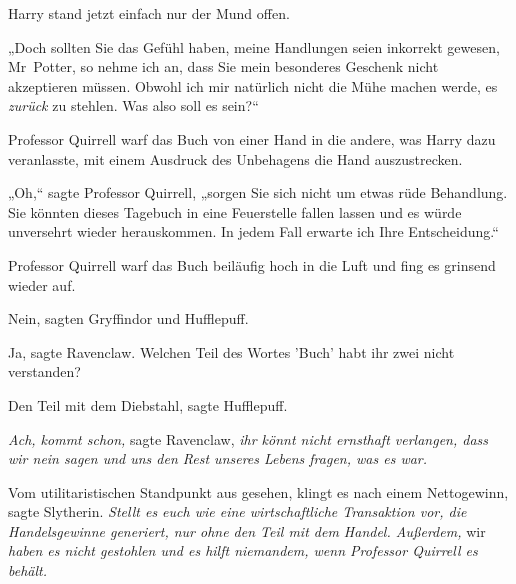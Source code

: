 {%
Harry stand jetzt einfach nur der Mund offen.

„Doch sollten Sie das Gefühl haben, meine Handlungen seien inkorrekt gewesen, Mr~Potter, so nehme ich an, dass Sie mein besonderes Geschenk nicht akzeptieren müssen. Obwohl ich mir natürlich nicht die Mühe machen werde, es \emph{zurück} zu stehlen. Was also soll es sein?“

Professor Quirrell warf das Buch von einer Hand in die andere, was Harry dazu veranlasste, mit einem Ausdruck des Unbehagens die Hand auszustrecken.

„Oh,“ sagte Professor Quirrell, „sorgen Sie sich nicht um etwas rüde Behandlung. Sie könnten dieses Tagebuch in eine Feuerstelle fallen lassen und es würde unversehrt wieder herauskommen. In jedem Fall erwarte ich Ihre Entscheidung.“

Professor Quirrell warf das Buch beiläufig hoch in die Luft und fing es grinsend wieder auf.

Nein, sagten Gryffindor und Hufflepuff.

Ja, sagte Ravenclaw. Welchen Teil des Wortes 'Buch' habt ihr zwei nicht verstanden?

Den Teil mit dem Diebstahl, sagte Hufflepuff.

\emph{Ach, kommt schon,} sagte Ravenclaw, \emph{ihr könnt nicht ernsthaft verlangen, dass wir nein sagen und uns den Rest unseres Lebens fragen, was es war.}

Vom utilitaristischen Standpunkt aus gesehen, klingt es nach einem Nettogewinn, sagte Slytherin. \emph{Stellt es euch wie eine wirtschaftliche Transaktion vor, die Handelsgewinne generiert, nur ohne den Teil mit dem Handel. Außerdem,} wir \emph{haben es nicht gestohlen und es hilft niemandem, wenn Professor Quirrell es behält.}

}
